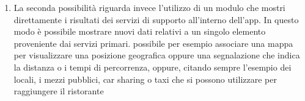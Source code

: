 \begin{itemize}
\begin{enumerate}
		\item
		La seconda possibilità riguarda invece l'utilizzo di un modulo che mostri direttamente i risultati dei servizi di supporto all'interno dell'app. In questo modo è possibile mostrare nuovi dati relativi a un singolo elemento proveniente dai servizi primari. \upe possibile per esempio associare una mappa per visualizzare una posizione geografica oppure una segnalazione che indica la distanza o i tempi di percorrenza, oppure, citando sempre l'esempio dei locali, i mezzi pubblici, car sharing o taxi che si possono utilizzare per raggiungere il ristorante
	\end{enumerate}
\end{itemize}